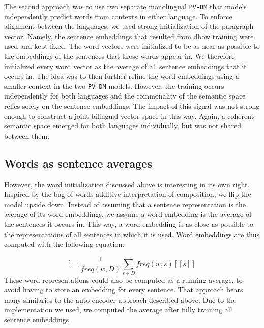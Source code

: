 The second approach was to use two separate monolingual \texttt{PV-DM} that models  independently predict words from contexts in either language. To enforce alignment between the languages, we used strong initialization of the paragraph vector. Namely, the sentence embeddings that resulted from dbow training were used and kept fixed.
The word vectors were initialized to be as near as possible to the embeddings of the sentences that those words appear in.
We therefore initialized every word vector as the average of all sentence embeddings that it occurs in.
The idea was to then further refine the word embeddings using a smaller context in the two \texttt{PV-DM} models.
However, the training occurs independently for both languages and the commonality of the semantic space relies solely on the sentence embeddings. The impact of this signal was not strong enough to construct a joint bilingual vector space in this way. Again, a coherent semantic space emerged for both languages individually, but was not shared between them. 


% 



\subsection{Words as sentence averages}

However, the word initialization discussed above is interesting in its own right.
Inspired by the bag-of-words additive interpretation of composition, we flip the model upside down.
Instead of assuming that a sentence representation is the average of its word embeddings, we assume a word embedding is the average of the sentences it occurs in.
This way, a word embedding is as close as possible to the representations of all sentences in which it is used.
Word embeddings are thus computed with the following equation:

\begin{equation*}
[\![ w ]\!] =\frac{1}{freq(w,D)}\sum_{s\in D}freq(w,s) [\![ s ]\!]
\end{equation*}
These word representations could also be computed as a running average, to avoid having to store an embedding for every sentence.
That approach bears many similaries to the auto-encoder approach described above.
Due to the implementation we used, we computed the average after fully training all sentence embeddings.

